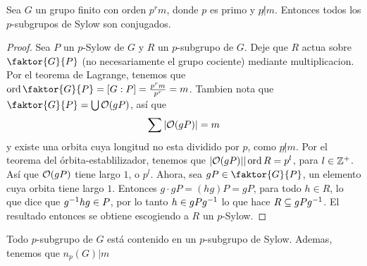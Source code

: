 \begin{theorem}\label{8.37}
    Sea $G$ un grupo finito con orden  $p^rm$, donde  $p$ es primo y  $p
    \not|m$. Entonces todos los $p$-subgrupos de Sylow son conjugados.
\end{theorem}
\begin{proof}
    Sea $P$ un  $p$-Sylow de  $G$ y  $R$ un  $p$-subgrupo de  $G$. Deje que  $R$
    actua sobre $\faktor{G}{P}$ (no necesariamente el grupo cociente) mediante
    multiplicacion. Por el teorema de Lagrange, tenemos que
    $\ord{\faktor{G}{P}}=[G:P]=\frac{p^rm}{p^r}=m$. Tambien nota que
     $\faktor{G}{P}=\bigcup{\Oc(gP)}$, as\'i que
     \begin{equation*}
         \sum{|\mathcal{O}(gP)|}=m
     \end{equation*}
     y existe una orbita cuya longitud no esta dividido por $p$, como  $p \not|
     m$. Por el teorema del \'orbita-establilizador, tenemos que $|\mathcal{O}(gP)| |
     \operatorname{ord}{R}=p^l$, para $l \in \mathbb{Z}^+$. As\'i que  $\mathcal{O}(gP)$ tiene largo $1$, o
     $p^l$. Ahora, sea  $gP \in \faktor{G}{P}$, un elemento cuya orbita tiene
     largo $1$. Entonces  $g \cdot gP=(hg)P=gP$, para todo $h \in R$, lo que
     dice que  $g^{-1}hg \in P$, por lo tanto $h \in gPg^{-1}$ lo que hace $R
     \subseteq gPg^{-1}$. El resultado entonces se obtiene escogiendo a $R$ un
      $p$-Sylow.
\end{proof}
\begin{corollary}
    Todo $p$-subgrupo de  $G$ est\'a contenido en un  $p$-subgrupo de Sylow.
    Ademas, tenemos que  $n_p(G)|m$
\end{corollary}
